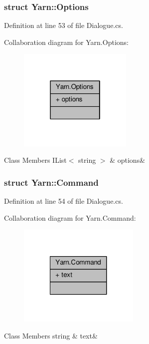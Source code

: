 \subsubsection{struct Yarn\-:\-:Options}


Definition at line 53 of file Dialogue.\-cs.



Collaboration diagram for Yarn.\-Options\-:
\nopagebreak
\begin{figure}[H]
\begin{center}
\leavevmode
\includegraphics[width=154pt]{a00379}
\end{center}
\end{figure}
\begin{DoxyFields}{Class Members}
\hypertarget{a00045_ae8c616d923ceeeed192a9436c55d9917}{I\-List$<$ string $>$}\label{a00045_ae8c616d923ceeeed192a9436c55d9917}
&
options&
\\
\hline

\end{DoxyFields}
\label{a00361}
\hypertarget{a00045_a00361}{}
\subsubsection{struct Yarn\-:\-:Command}


Definition at line 54 of file Dialogue.\-cs.



Collaboration diagram for Yarn.\-Command\-:
\nopagebreak
\begin{figure}[H]
\begin{center}
\leavevmode
\includegraphics[width=164pt]{a00380}
\end{center}
\end{figure}
\begin{DoxyFields}{Class Members}
\hypertarget{a00045_a8564e5104566e145f5d917ec846444d9}{string}\label{a00045_a8564e5104566e145f5d917ec846444d9}
&
text&
\\
\hline

\end{DoxyFields}
